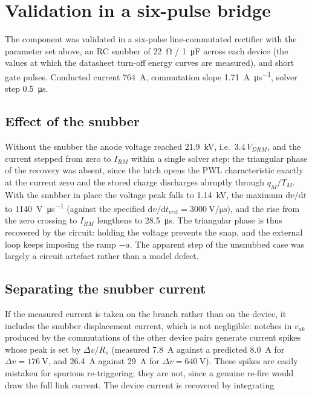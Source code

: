 \documentclass[11pt,a4paper]{article}
\begin{document}
\section{Validation in a six-pulse bridge}

The component was validated in a six-pulse line-commutated rectifier with
the parameter set above, an RC snubber of \SI{22}{\ohm} / \SI{1}{\micro\farad}
across each device (the values at which the datasheet turn-off energy curves
are measured), and short gate pulses. Conducted current \SI{764}{\ampere},
commutation slope \SI{1.71}{\ampere\per\micro\second}, solver step
\SI{0.5}{\micro\second}.

\subsection{Effect of the snubber}

Without the snubber the anode voltage reached \SI{21.9}{\kilo\volt}, i.e.\
$3.4\,V_{DRM}$, and the current stepped from zero to $I_{RM}$ within a single
solver step: the triangular phase of the recovery was absent, since the latch
opens the PWL characteristic exactly at the current zero and the stored
charge discharges abruptly through $q_M/T_M$. With the snubber in place the
voltage peak falls to \SI{1.14}{\kilo\volt}, the maximum
$\mathrm{d}v/\mathrm{d}t$ to \SI{1140}{\volt\per\micro\second} (against the
specified $\mathrm{d}v/\mathrm{d}t_{crit} = \SI{3000}{\volt\per\micro\second}$),
and the rise from the zero crossing to $I_{RM}$ lengthens to
\SI{28.5}{\micro\second}. The triangular phase is thus recovered by the
circuit: holding the voltage prevents the snap, and the external loop keeps
imposing the ramp $-a$. The apparent step of the unsnubbed case was largely a
circuit artefact rather than a model defect.

\subsection{Separating the snubber current}

If the measured current is taken on the branch rather than on the device, it
includes the snubber displacement current, which is not negligible: notches
in $v_{ak}$ produced by the commutations of the other device pairs generate
current spikes whose peak is set by $\Delta v / R_s$ (measured
\SI{7.8}{\ampere} against a predicted \SI{8.0}{\ampere} for
$\Delta v = \SI{176}{\volt}$, and \SI{26.4}{\ampere} against
\SI{29}{\ampere} for $\Delta v = \SI{640}{\volt}$). These spikes are easily
mistaken for spurious re-triggering; they are not, since a genuine re-fire
would draw the full link current. The device current is recovered by
integrating
\end{document}
